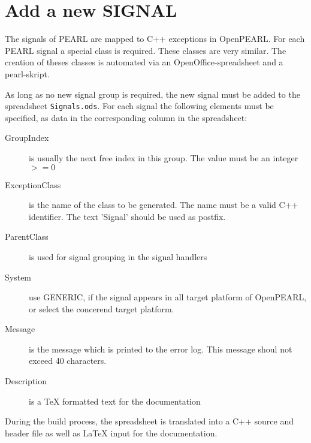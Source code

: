 \section{Add a new SIGNAL}
The signals of PEARL are mapped to C++ exceptions in OpenPEARL.
For each PEARL signal a special class is required.
These classes are very similar. The creation of theses classes
is automated via an OpenOffice-spreadsheet and a pearl-skript.

As long as no new signal group is required, the new signal
must be added to the spreadsheet \texttt{Signals.ods}.
For each signal the following elements must be specified, as 
data in the corresponding column in the spreadsheet:
\begin{description} 
\item[GroupIndex] is usually the next free index in this group.
   The value must be an integer $>= 0$
\item [ExceptionClass] is the name of the class to be generated.
   The name must be a valid C++ identifier. The text 'Signal' should
   be used as postfix.
\item[ParentClass] is used for signal grouping in the signal handlers
\item[System] use GENERIC, if the signal appears in all target
   platform of OpenPEARL, or select the concerend target platform.
\item[Message] is the message which is printed to the error log.
   This message shoul not exceed 40 characters.
\item[Description] is a TeX formatted text for the documentation
\end{description}

During the build process, the spreadsheet is translated into a C++ source
and  header file as well as LaTeX input for the documentation.
